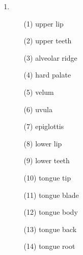 \documentclass{article}
\begin{document}
\begin{enumerate}
    \item \begin{enumerate}
            \item[(1)] upper lip
            \item[(2)] upper teeth
            \item[(3)] alveolar ridge
            \item[(4)] hard palate
            \item[(5)] velum
            \item[(6)] uvula
            \item[(7)] epiglottis
            \item[(8)] lower lip
            \item[(9)] lower teeth
            \item[(10)] tongue tip
            \item[(11)] tongue blade
            \item[(12)] tongue body
            \item[(13)] tongue back
            \item[(14)] tongue root
          \end{enumerate}
  \end{enumerate}
\end{document}
